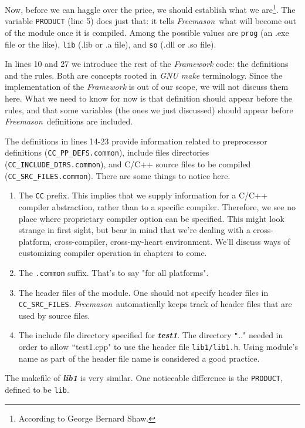 \documentclass[a4paper]{article}
\newcommand{\freemason}{\textit{Freemason}}
\newcommand{\name}[1]{\emph{#1}}
\newcommand{\nameb}[1]{\textbf{\emph{#1}}}
\newcommand{\concept}[1]{\textit{#1}}
\begin{document}
Now, before we can haggle over the price, we should establish what we are\footnote{According to George Bernard Shaw.}. The variable \verb"PRODUCT" (line 5) does just that: it tells \freemason\ what will become out of the module once it is compiled.
Among the possible values are \verb"prog" (an .exe file or the like), \verb"lib" (.lib or .a file), and \verb"so" (.dll or .so file).
\par
In lines 10 and 27 we introduce the rest of the \concept{Framework} code: the definitions and the rules. Both are concepts
rooted in \name{GNU make} terminology. Since the implementation of the \concept{Framework} is out of our scope, we will not discuss
them here. What we need to know for now is that definition should appear before the rules, and that some variables (the ones we just
discussed) should appear before \freemason\ definitions are included.
\par
The definitions in lines 14-23 provide information related to preprocessor definitions (\verb"CC_PP_DEFS.common"), include files directories
(\verb"CC_INCLUDE_DIRS.common"), and C/C++ source files to be compiled \\(\verb"CC_SRC_FILES.common"). There are some things to notice here.
\begin{enumerate}
	\item The \verb"CC" prefix. This implies that we supply information for a C/C++ compiler abstraction, rather than to a specific compiler.
		Therefore, we see no place where proprietary compiler option can be specified. This might look strange in first sight, but bear in mind
		that we're dealing with a cross-platform, cross-compiler, cross-my-heart environment. We'll discuss ways of customizing compiler operation
        in chapters to come.
	\item The \verb".common" suffix. That's to say "for all platforms".
	\item The header files of the module. One should not specify header files in \verb"CC_SRC_FILES". \freemason\ automatically keeps
		track of header files that are used by source files.
	\item The include file directory specified for \nameb{test1}. The directory \texttt".." needed in order to allow \texttt"test1.cpp" to
		use the header file \verb"lib1/lib1.h". Using module's name as part of the header file name is considered a good practice.
\end{enumerate}
\par
The makefile of \nameb{lib1} is very similar. One noticeable difference is the \verb"PRODUCT", defined to be \verb"lib".
\end{document}
